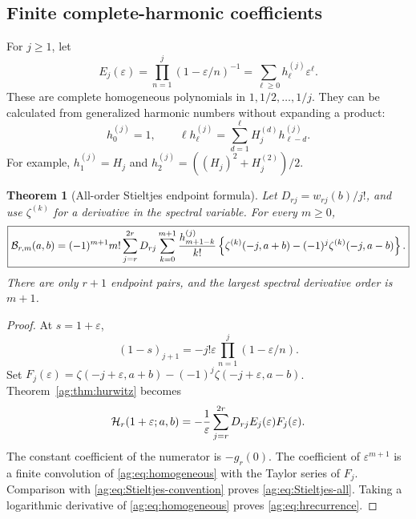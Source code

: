 \documentclass[11pt,letterpaper]{article}
\numberwithin{equation}{section}
\newtheorem{theorem}{Theorem}[section]
\theoremstyle{definition}\newtheorem{definition}[theorem]{Definition}
\theoremstyle{remark}\newtheorem{remark}[theorem]{Remark}
\begin{document}
\subsection{Finite complete-harmonic coefficients}
For $j\ge1$, let
\begin{equation}\label{ag:eq:homogeneous}
 E_j(\varepsilon)=\prod_{n=1}^j(1-\varepsilon/n)^{-1}
               =\sum_{\ell\ge0}h_\ell^{(j)}\varepsilon^\ell.
\end{equation}
These are complete homogeneous polynomials in $1,1/2,\ldots,1/j$.
They can be calculated from generalized harmonic numbers without
expanding a product:
\begin{equation}\label{ag:eq:hrecurrence}
 h_0^{(j)}=1,\qquad
 \ell h_\ell^{(j)}=\sum_{d=1}^\ell H_j^{(d)}h_{\ell-d}^{(j)}.
\end{equation}
For example, $h_1^{(j)}=H_j$ and
$h_2^{(j)}=((H_j)^2+H_j^{(2)})/2$.

\begin{theorem}[All-order Stieltjes endpoint formula]
\label{ag:thm:Stieltjes}
Let $D_{rj}=w_{rj}(b)/j!$, and use $\zeta^{(k)}$ for a derivative
in the spectral variable. For every $m\ge0$,
\begin{align}
 \boxed{\displaystyle
 \mathcal B_{r,m}(a,b)=(-1)^{m+1}m!
 \sum_{j=r}^{2r}D_{rj}\sum_{k=0}^{m+1}
 \frac{h_{m+1-k}^{(j)}}{k!}
 \left\{\zeta^{(k)}(-j,a+b)-(-1)^j\zeta^{(k)}(-j,a-b)\right\}.}
 \label{ag:eq:Stieltjes-all}
\end{align}
There are only $r+1$ endpoint pairs, and the largest spectral derivative
order is $m+1$.
\end{theorem}
\begin{proof}
At $s=1+\varepsilon$,
\[
 (1-s)_{j+1}=-j!\varepsilon\prod_{n=1}^j(1-\varepsilon/n).
\]
Set
$F_j(\varepsilon)=\zeta(-j+\varepsilon,a+b)
 -(-1)^j\zeta(-j+\varepsilon,a-b)$.
Theorem~\ref{ag:thm:hurwitz} becomes
\begin{equation}\label{ag:eq:H-Laurent-master}
 \mathcal H_r(1+\varepsilon;a,b)
 =-\frac1\varepsilon\sum_{j=r}^{2r}D_{rj}
                          E_j(\varepsilon)F_j(\varepsilon).
\end{equation}
The constant coefficient of the numerator is $-g_r(0)$.
The coefficient of $\varepsilon^{m+1}$ is a finite convolution of
\eqref{ag:eq:homogeneous} with the Taylor series of $F_j$.
Comparison with \eqref{ag:eq:Stieltjes-convention} proves
\eqref{ag:eq:Stieltjes-all}. Taking a logarithmic derivative of
\eqref{ag:eq:homogeneous} proves \eqref{ag:eq:hrecurrence}.
\end{proof}
\end{document}
